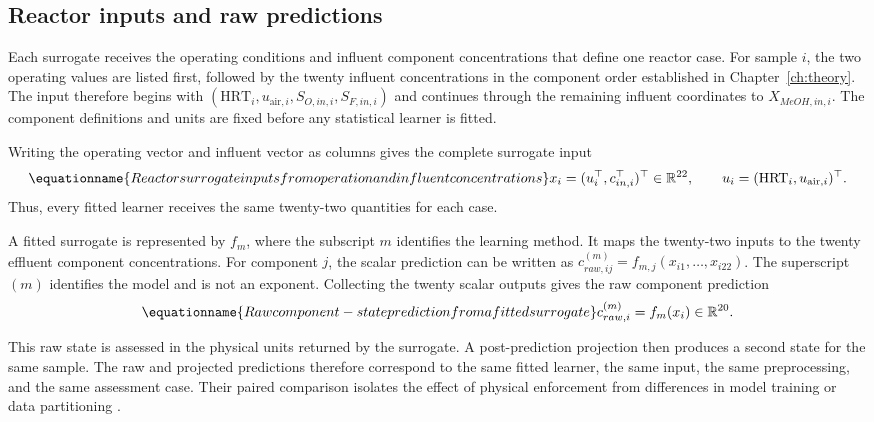 \subsection{Reactor inputs and raw predictions}

Each surrogate receives the operating conditions and influent component concentrations that define one reactor case. For sample $i$, the two operating values are listed first, followed by the twenty influent concentrations in the component order established in Chapter~\ref{ch:theory}. The input therefore begins with $(\mathrm{HRT}_i,u_{\mathrm{air},i},S_{O,in,i},S_{F,in,i})$ and continues through the remaining influent coordinates to $X_{MeOH,in,i}$. The component definitions and units are fixed before any statistical learner is fitted.

Writing the operating vector and influent vector as columns gives the complete surrogate input
\begin{equation}
\equationname{Reactor surrogate inputs from operation and influent concentrations}
x_i=(u_i^\top,c_{in,i}^\top)^\top\in\mathbb{R}^{22},\qquad
u_i=(\mathrm{HRT}_i,u_{\mathrm{air},i})^\top.
\label{eq:surrogate_input_vector}
\end{equation}
Thus, every fitted learner receives the same twenty-two quantities for each case.

A fitted surrogate is represented by $f_m$, where the subscript $m$ identifies the learning method. It maps the twenty-two inputs to the twenty effluent component concentrations. For component $j$, the scalar prediction can be written as
$c_{raw,ij}^{(m)}=f_{m,j}(x_{i1},\ldots,x_{i22})$.
The superscript $(m)$ identifies the model and is not an exponent. Collecting the twenty scalar outputs gives the raw component prediction
\begin{equation}
\equationname{Raw component-state prediction from a fitted surrogate}
c_{raw,i}^{(m)}=f_m(x_i)\in\mathbb{R}^{20}.
\label{eq:surrogate_raw_state}
\end{equation}

This raw state is assessed in the physical units returned by the surrogate. A post-prediction projection then produces a second state for the same sample. The raw and projected predictions therefore correspond to the same fitted learner, the same input, the same preprocessing, and the same assessment case. Their paired comparison isolates the effect of physical enforcement from differences in model training or data partitioning \citep{SturmSilva2024,KircherVotsmeier2025}.

